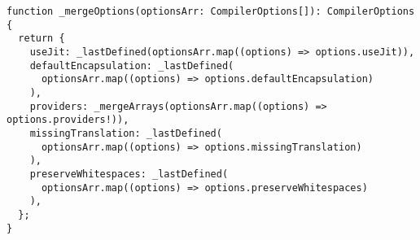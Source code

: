 \begin{verbatim}
function _mergeOptions(optionsArr: CompilerOptions[]): CompilerOptions {
  return {
    useJit: _lastDefined(optionsArr.map((options) => options.useJit)),
    defaultEncapsulation: _lastDefined(
      optionsArr.map((options) => options.defaultEncapsulation)
    ),
    providers: _mergeArrays(optionsArr.map((options) => options.providers!)),
    missingTranslation: _lastDefined(
      optionsArr.map((options) => options.missingTranslation)
    ),
    preserveWhitespaces: _lastDefined(
      optionsArr.map((options) => options.preserveWhitespaces)
    ),
  };
}
\end{verbatim}
